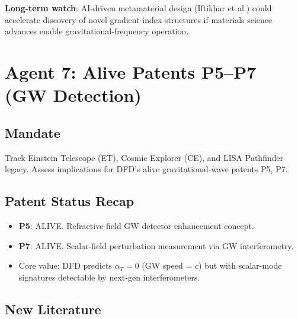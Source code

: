 \documentclass[11pt,a4paper]{article}
\begin{document}
\textbf{Long-term watch}: AI-driven metamaterial design (Iftikhar et al.) could accelerate discovery of novel gradient-index structures if materials science advances enable gravitational-frequency operation.

\section{Agent 7: Alive Patents P5--P7 (GW Detection)}

\subsection{Mandate}
Track Einstein Telescope (ET), Cosmic Explorer (CE), and LISA Pathfinder legacy. Assess implications for DFD's alive gravitational-wave patents P5, P7.

\subsection{Patent Status Recap}
\begin{itemize}
\item \textbf{P5}: ALIVE. Refractive-field GW detector enhancement concept.
\item \textbf{P7}: ALIVE. Scalar-field perturbation measurement via GW interferometry.
\item Core value: DFD predicts $\alpha_T = 0$ (GW speed = $c$) but with scalar-mode signatures detectable by next-gen interferometers.
\end{itemize}

\subsection{New Literature}
\end{document}

